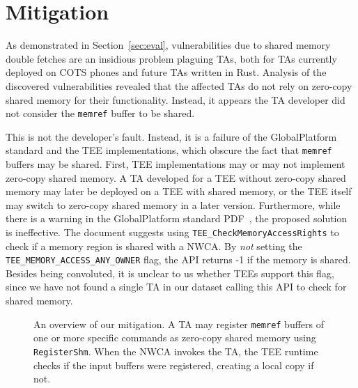 \section{Mitigation}\label{sec:mitigation}

As demonstrated in Section~\ref{sec:eval}, vulnerabilities due to shared memory 
double fetches are an insidious problem plaguing TAs, both for TAs currently 
deployed on COTS phones and future TAs written in Rust.
Analysis of the discovered 
vulnerabilities revealed that the affected TAs do not rely on zero-copy shared 
memory for their functionality. Instead, it appears the TA developer did not 
consider the \texttt{memref} buffer to be shared.

This is not the developer's fault. Instead, it is a failure of the GlobalPlatform standard and 
the TEE implementations, which obscure the fact that \texttt{memref} buffers may 
be shared. First, TEE implementations may or may not implement zero-copy shared 
memory. A TA developed for a TEE without zero-copy shared memory may later be 
deployed on a TEE with shared memory, or the TEE itself may switch to zero-copy 
shared memory in a later version. Furthermore, while there is a warning in the 
GlobalPlatform standard PDF~\cite{gpintapi}, the proposed solution is ineffective. The document 
suggests using \texttt{TEE\_CheckMemoryAccessRights} to check 
if a memory region is shared with a NWCA. By \emph{not} setting the \texttt{TEE\_MEMORY\_ACCESS\_ANY\_OWNER} 
flag, the API returns -1 if the memory is shared. Besides being convoluted, it 
is unclear to us whether TEEs support this flag, since we have not 
found a single TA in our dataset calling this API to check for shared memory. 

\begin{figure}[]
  \centering
  
  \caption{
    An overview of our mitigation. A TA may register \texttt{memref} buffers of 
    one or more specific commands as zero-copy shared memory using \texttt{RegisterShm}.
    When the NWCA invokes the TA, the TEE runtime checks if the input buffers were registered, 
    creating a local copy if not.
    }
  \label{fig:mitigation}
\end{figure}

